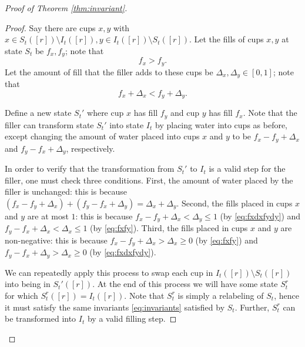 \documentclass[twocolumn]{article}[10pt]
\begin{document}
\begin{proof}[Proof of Theorem \ref{thm:invariant}]
\begin{proof}
Say there are cups $x, y$ with $x\in S_t([r]) \setminus I_t([r]), y \in
 I_t([r])\setminus S_t([r])$. Let the fills of cups $x,y$ at state $S_t$
 be $f_x, f_y$; note that 
 \begin{equation}
     f_x > f_y.
     \label{eq:fxfy}
 \end{equation} Let the amount of fill that the filler
 adds to these cups be $\Delta_x, \Delta_y \in [0,1]$; note that 
 \begin{equation}
 f_x +\Delta_x <f_y + \Delta_y.
 \label{eq:fxdxfydy}
 \end{equation}
 
Define a new state $S_t'$ where cup $x$ has fill $f_y$ and cup $y$ has fill
$f_x$. Note that the filler can transform state $S_t'$ into state $I_t$ by
placing water into cups as before, except changing the amount of water placed
into cups $x$ and $y$ to be  $f_x-f_y+\Delta_x$ and $f_y-f_x + \Delta_y$,
respectively.

In order to verify that the transformation from $S_t'$ to $I_t$ is a valid step
for the filler, one must check three conditions. First, the amount of water
placed by the filler is unchanged: this is because $(f_x-f_y + \Delta_x) +
(f_y-f_x+\Delta_y) = \Delta_x + \Delta_y$. Second, the fills placed in cups $x$
and $y$ are at most $1$: this is because $f_x-f_y+\Delta_x<\Delta_y \le 1$ (by
\eqref{eq:fxdxfydy}) and $f_y-f_x + \Delta_x < \Delta_x \le 1$ (by
\eqref{eq:fxfy}). Third, the fills placed in cups $x$ and $y$ are non-negative:
this is because $f_x-f_y + \Delta_x > \Delta_x \ge 0$ (by \eqref{eq:fxfy})
and $f_y-f_x+\Delta_y > \Delta_x \ge 0$ (by
\eqref{eq:fxdxfydy}). 

We can repeatedly apply this process to swap each cup in $I_t([r])\setminus
S_t([r])$ into being in $S_t'([r])$. At
the end of this process we will have some state $S_t^r$ for which
$S_t^r([r]) = I_t([r])$. Note that $S_t^r$ is simply a relabeling of $S_t$,
hence it must satisfy the same invariants \eqref{eq:invariants} satisfied by
$S_t$. Further, $S_t^r$ can be transformed into $I_t$ by a valid filling step.


\end{proof}
\end{proof}
\end{document}
